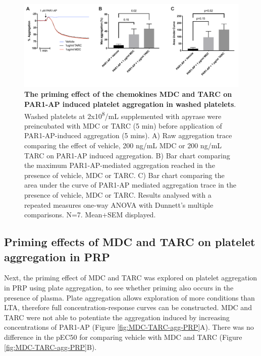 \documentclass[11pt,twoside]{bristolthesis}
\begin{document}
\begin{figure}

{\centering \includegraphics[width=0.95\linewidth]{figure/Chemokines/Layouts/MDC_TARC_aggregation_PAR1} 

}

\caption[The priming effect of the chemokines MDC and TARC on PAR1-AP induced platelet aggregation in washed platelets]{\textbf{The priming effect of the chemokines MDC and TARC on PAR1-AP induced platelet aggregation in washed platelets}. Washed platelets at 2x10\textsuperscript{8}/mL supplemented with apyrase were preincubated with MDC or TARC (5 min) before application of PAR1-AP-induced aggregation (5 mins). A) Raw aggregation trace comparing the effect of vehicle, 200 ng/mL MDC or 200 ng/mL TARC on PAR1-AP induced aggregation. B) Bar chart comparing the maximum PAR1-AP-mediated aggregation reached in the presence of vehicle, MDC or TARC. C) Bar chart comparing the area under the curve of PAR1-AP mediated aggregation trace in the presence of vehicle, MDC or TARC. Results analysed with a repeated measures one-way ANOVA with Dunnett's multiple comparisons. N=7. Mean+SEM displayed.}\label{fig:MDC-TARC-agg}
\end{figure}
\hypertarget{priming-effects-of-mdc-and-tarc-on-platelet-aggregation-in-prp}{%
\subsection{Priming effects of MDC and TARC on platelet aggregation in PRP}\label{priming-effects-of-mdc-and-tarc-on-platelet-aggregation-in-prp}}

Next, the priming effect of MDC and TARC was explored on platelet aggregation in PRP using plate aggregation, to see whether priming also occurs in the presence of plasma. Plate aggregation allows exploration of more conditions than LTA, therefore full concentration-response curves can be constructed. MDC and TARC were not able to potentiate the aggregation induced by increasing concentrations of PAR1-AP (Figure \ref{fig:MDC-TARC-agg-PRP}A). There was no difference in the pEC50 for comparing vehicle with MDC and TARC (Figure \ref{fig:MDC-TARC-agg-PRP}B).
\end{document}
